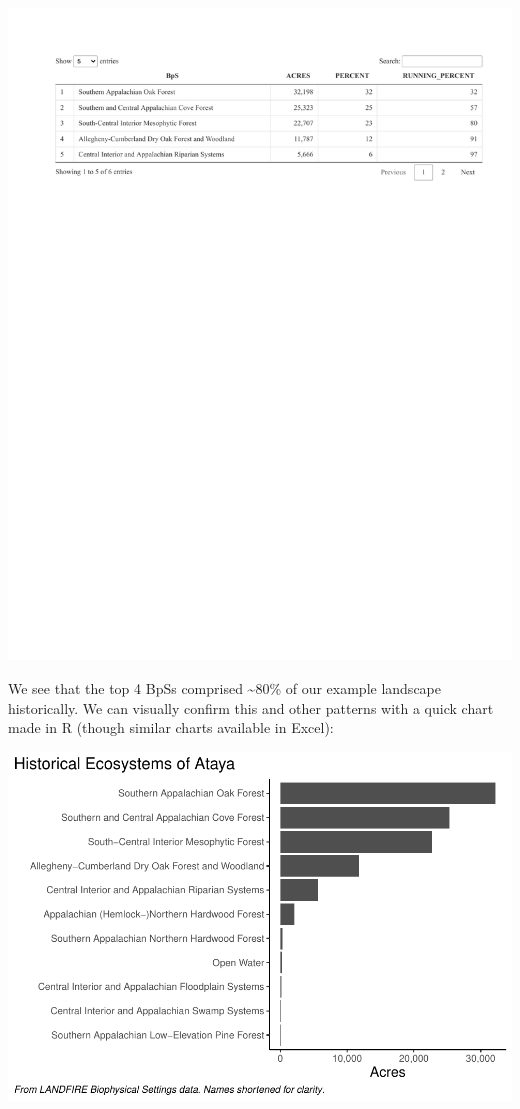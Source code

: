 \documentclass[
]{book}
\begin{document}
\includegraphics{FSCBook_files/figure-latex/bpsDT-1.pdf}

We see that the top 4 BpSs comprised \textasciitilde80\% of our example landscape historically. We can visually confirm this and other patterns with a quick chart made in R (though similar charts available in Excel):

\includegraphics{FSCBook_files/figure-latex/bpsChart-1.pdf}
\end{document}
